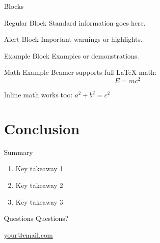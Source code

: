 \documentclass{beamer}
\begin{document}
\begin{frame}{Blocks}
    \begin{block}{Regular Block}
        Standard information goes here.
    \end{block}

    \begin{alertblock}{Alert Block}
        Important warnings or highlights.
    \end{alertblock}

    \begin{exampleblock}{Example Block}
        Examples or demonstrations.
    \end{exampleblock}
\end{frame}

\begin{frame}{Math Example}
    Beamer supports full LaTeX math:
    \begin{equation}
        E = mc^2
    \end{equation}

    Inline math works too: $a^2 + b^2 = c^2$
\end{frame}

\section{Conclusion}

\begin{frame}{Summary}
    \begin{enumerate}
        \item Key takeaway 1
        \item Key takeaway 2
        \item Key takeaway 3
    \end{enumerate}
\end{frame}

\begin{frame}{Questions}
    \centering
    \Huge Questions?

    \vspace{1cm}
    \normalsize
    \href{mailto:your@email.com}{your@email.com}
\end{frame}
\end{document}
